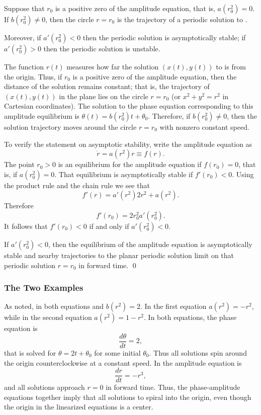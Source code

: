 \documentclass{ximera}
\begin{document}
\begin{prop}
Suppose that $r_0$ is a positive zero of the amplitude equation, that is,
$a(r_0^2)=0$.  If $b(r_0^2)\neq 0$, then the circle $r=r_0$ is the
trajectory of a periodic solution to .  

Moreover, if $a'(r^2_0)<0$ then the periodic solution is asymptotically 
stable; if $a'(r^2_0)>0$ then the periodic solution is unstable.
\end{prop}

\proof  The function $r(t)$ measures how far the solution $(x(t),y(t))$ to
 is from the origin.  Thus, if $r_0$ is a positive zero of the 
amplitude equation, then the distance of the solution remains constant; that
is, the trajectory of $(x(t),y(t))$ in the plane lies on the circle $r=r_0$
(or $x^2+y^2=r^2$ in Cartesian coordinates).  The solution to the phase 
equation corresponding to this amplitude equilibrium is 
$\theta(t)=b(r_0^2)t+\theta_0$.  Therefore, if $b(r_0^2)\neq 0$, then the 
solution trajectory moves around the circle $r=r_0$ with nonzero constant 
speed.

To verify the statement on asymptotic stability, write the amplitude 
equation as 
\[
\dot{r} = a(r^2)r \equiv f(r).
\]
The point $r_0>0$ is an equilibrium for the amplitude equation if $f(r_0)=0$, 
that is, if $a(r_0^2)=0$.  That equilibrium is asymptotically stable if 
$f'(r_0)<0$.  Using the product rule and the chain rule we see that 
\[
f'(r) = a'(r^2)2r^2 +a(r^2).
\]
Therefore
\[
f'(r_0) = 2r_0^2a'(r_0^2).
\]
It follows that $f'(r_0)<0$ if and only if $a'(r_0^2)<0$.
  
If $a'(r^2_0)<0$, then the equilibrium of the amplitude equation is 
asymptotically stable and nearby trajectories to the planar periodic solution
limit on that periodic solution $r=r_0$ in forward time.  \qed 



\subsubsection*{The Two Examples}

As noted, in both equations  and 
$b(r^2) = 2$.  In the first equation $a(r^2) = -r^2$, while in
the second equation $a(r^2)=1-r^2$.  In both equations, the
phase equation is
\[
\frac{d\theta}{dt} = 2,
\]
that is solved for $\theta = 2t + \theta_0$ for some initial
$\theta_0$.  Thus all solutions spin around the origin
counterclockwise at a constant speed.  In 
the amplitude equation is
\[
\frac{dr}{dt} = -r^3,
\]
and all solutions approach $r=0$ in forward time.  Thus, the 
phase-amplitude equations together imply that all solutions 
to  spiral into the origin, even though the 
origin in the linearized equations is a center. 
\end{document}
